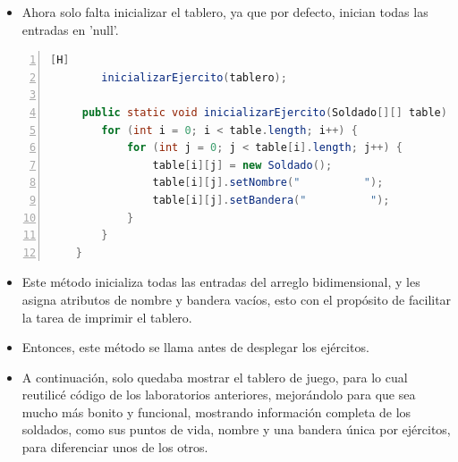 \documentclass{article}
\begin{document}
	\begin{itemize}	
		\item Ahora solo falta inicializar el tablero, ya que por defecto, inician todas las entradas en 'null'.
	\end{itemize}
	\begin{lstlisting}[language=java,caption={Inicializando tablero}, numbers=left][H]
	 	inicializarEjercito(tablero);
	 
	 public static void inicializarEjercito(Soldado[][] table) {
        for (int i = 0; i < table.length; i++) {
            for (int j = 0; j < table[i].length; j++) {
                table[i][j] = new Soldado();
                table[i][j].setNombre("          ");
                table[i][j].setBandera("          ");
            }
        }
    }
	\end{lstlisting}
	\begin{itemize}	
		\item Este método inicializa todas las entradas del arreglo bidimensional, y les asigna atributos de nombre y bandera vacíos, esto con el propósito de facilitar la tarea de imprimir el tablero.
		\item Entonces, este método se llama antes de desplegar los ejércitos.
		\item A continuación, solo quedaba mostrar el tablero de juego, para lo cual reutilicé código de los laboratorios anteriores, mejorándolo para que sea mucho más bonito y funcional, mostrando información completa de los soldados, como sus puntos de vida, nombre y una bandera única por ejércitos, para diferenciar unos de los otros.
	\end{itemize}
\end{document}
